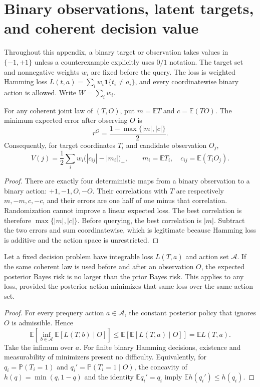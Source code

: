
\section{Binary observations, latent targets, and coherent decision value}

Throughout this appendix, a binary target or observation takes values in
$\{-1,+1\}$ unless a counterexample explicitly uses $0/1$ notation.
The target set and nonnegative weights $w_i$ are fixed before the query.
The loss is weighted Hamming loss
$L(t,a)=\sum_i w_i\mathbf{1}\{t_i\ne a_i\}$, and every coordinatewise
binary action is allowed. Write $W=\sum_i w_i$.

\begin{lemma}
\label{lem:binary-observation-r3}
For any coherent joint law of $(T,O)$, put
$m=\mathbb{E}T$ and $c=\mathbb{E}(TO)$. The minimum expected error after
observing $O$ is
\[
 r^O=\frac{1-\max\{|m|,|c|\}}{2}.
\]
Consequently, for target coordinates $T_i$ and candidate observation $O_j$,
\[
 V(j)=\frac12\sum_i w_i\bigl(|c_{ij}|-|m_i|\bigr)_+,
 \qquad m_i=\mathbb{E}T_i,\quad c_{ij}=\mathbb{E}(T_iO_j).
\]
\end{lemma}
\begin{proof}
There are exactly four deterministic maps from a binary observation to a
binary action: $+1,-1,O,-O$. Their correlations with $T$ are respectively
$m,-m,c,-c$, and their errors are one half of one minus that correlation.
Randomization cannot improve a linear expected loss. The best correlation
is therefore $\max\{|m|,|c|\}$. Before querying, the best correlation is
$|m|$. Subtract the two errors and sum coordinatewise, which is legitimate
because Hamming loss is additive and the action space is unrestricted.
\end{proof}

\begin{proposition}
\label{prop:nonnegative-r3}
Let a fixed decision problem have integrable loss $L(T,a)$ and action set
$\mathcal A$. If the same coherent law is used before and after an
observation $O$, the expected posterior Bayes risk is no larger than the
prior Bayes risk. This applies to any loss, provided the posterior action
minimizes that same loss over the same action set.
\end{proposition}
\begin{proof}
For every prequery action $a\in\mathcal A$, the constant posterior policy
that ignores $O$ is admissible. Hence
\[
 \mathbb{E}\!\left[\inf_{b\in\mathcal A}
          \mathbb{E}[L(T,b)\mid O]\right]
 \le \mathbb{E}\!\left[\mathbb{E}[L(T,a)\mid O]\right]
 =\mathbb{E}L(T,a).
\]
Take the infimum over $a$. For finite binary Hamming decisions, existence
and measurability of minimizers present no difficulty. Equivalently, for
$q_i=\mathbb{P}(T_i=1)$ and $q_i'=\mathbb{P}(T_i=1\mid O)$, the concavity
of $h(q)=\min(q,1-q)$ and the identity $\mathbb{E}q_i'=q_i$ imply
$\mathbb{E}h(q_i')\le h(q_i)$.
\end{proof}

